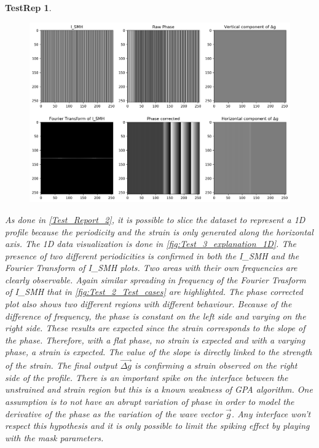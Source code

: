 \documentclass[12pt, titlepage]{article}
\newtheorem{TestRep}{TestRep}
\begin{document}
\begin{TestRep}
\begin{figure}[H]
\begin{center}
\includegraphics[scale=0.5]{Figures/Test_3_explanation.png}
\caption{}
\label{fig:Test_3_explanation}
\end{center}
\end{figure}

As done in \cref{Test_Report_2}, it is possible to slice the dataset to represent a 1D profile because the periodicity and the strain is only generated along the horizontal axis. The 1D data visualization is done in \cref{fig:Test_3_explanation_1D}. The presence of two different periodicities is confirmed in both the I{\_}SMH and the Fourier Transform of I{\_}SMH plots. Two areas with their own frequencies are clearly observable. Again similar spreading in frequency of the Fourier Trasform of I{\_}SMH that in \cref{fig:Test_2_Test_cases} are highlighted. The phase corrected plot also shows two different regions with different behaviour. Because of the difference of frequency, the phase is constant on the left side and varying on the right side. These results are expected since the strain corresponds to the slope of the phase. Therefore, with a flat phase, no strain is expected and with a varying phase, a strain is expected. The value of the slope is directly linked to the strength of the strain. The final output $\overrightarrow{\Delta g}$ is confirming a strain observed on the right side of the profile. There is an important spike on the interface between the unstrained and strain region but this is a known weakness of GPA algorithm. One assumption is to not have an abrupt variation of phase in order to model the derivative of the phase as the variation of the wave vector $\overrightarrow{g}$. Any interface won't respect this hypothesis and it is only possible to limit the spiking effect by playing with the mask parameters.


\end{TestRep}
\end{document}

